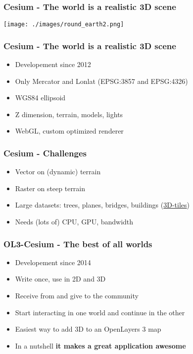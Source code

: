 \documentclass[handout]{beamer}
\begin{document}
  \begin{frame}
    \frametitle{Cesium - The world is a realistic 3D scene}
    \begin{center}
     \texttt{[image: ./images/round\_earth2.png]}
    \end{center}
    \end{frame}


  \begin{frame}
    \frametitle{Cesium - The world is a realistic 3D scene}
    \begin{itemize}
      \item Developement since 2012
      \pause\item Only Mercator and Lonlat (EPSG:3857 and EPSG:4326)
      \pause\item WGS84 ellipsoid
      \pause\item Z dimension, terrain, models, lights
      \pause\item WebGL, custom optimized renderer
    \end{itemize}
  \end{frame}


  \begin{frame}
    \frametitle{Cesium - Challenges}
    \begin{itemize}
      \pause\item Vector on (dynamic) terrain
      \pause\item Raster on steep terrain
      \pause\item Large datasets: trees, planes, bridges, buildings (\href {https://github.com/AnalyticalGraphicsInc/3d-tiles}{3D-tiles})
      \pause\item Needs (lots of) CPU, GPU, bandwidth
    \end{itemize}

   \end{frame}


  \begin{frame}
    \frametitle{OL3-Cesium - The best of all worlds}
    \begin{itemize}
      \item Developement since 2014
      \pause\item Write once, use in 2D and 3D
      \pause\item Receive from and give to the community
      \pause\item Start interacting in one world and continue in the other
      \pause\item Easiest way to add 3D to an OpenLayers 3 map
      \pause\item In a nutshell \textbf{it makes a great application awesome}
    \end{itemize}
  \end{frame}
\end{document}
